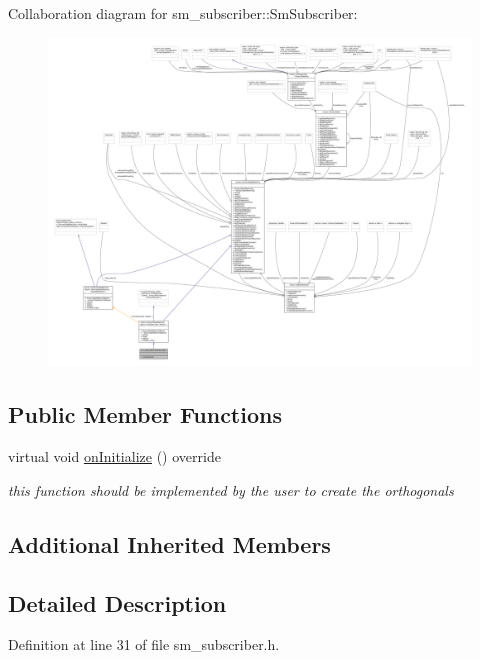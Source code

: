 Collaboration diagram for sm\+\_\+subscriber\+:\+:Sm\+Subscriber\+:
\nopagebreak
\begin{figure}[H]
\begin{center}
\leavevmode
\includegraphics[width=350pt]{structsm__subscriber_1_1SmSubscriber__coll__graph}
\end{center}
\end{figure}
\subsection*{Public Member Functions}
\begin{DoxyCompactItemize}
\item 
virtual void \hyperlink{structsm__subscriber_1_1SmSubscriber_ae32eb6aee71a536eff03a5fdb8c8554a}{on\+Initialize} () override
\begin{DoxyCompactList}\small\item\em this function should be implemented by the user to create the orthogonals \end{DoxyCompactList}\end{DoxyCompactItemize}
\subsection*{Additional Inherited Members}


\subsection{Detailed Description}


Definition at line 31 of file sm\+\_\+subscriber.\+h.



